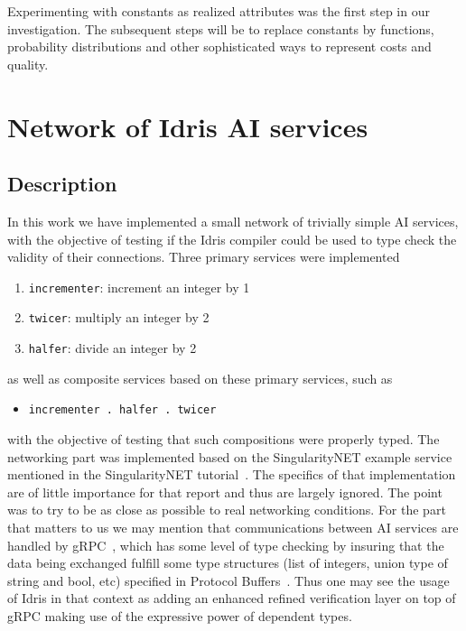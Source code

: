 \documentclass[]{report}
\begin{document}
Experimenting with constants as realized attributes was the first step
in our investigation.  The subsequent steps will be to replace
constants by functions, probability distributions and other
sophisticated ways to represent costs and quality.

\section{Network of Idris AI services}
\label{sec:network_idris_ai_services}

\subsection{Description}

In this work we have implemented a small network of trivially simple
AI services, with the objective of testing if the Idris compiler could
be used to type check the validity of their connections. Three primary
services were implemented
\begin{enumerate}
\item \texttt{incrementer}: increment an integer by 1
\item \texttt{twicer}: multiply an integer by 2
\item \texttt{halfer}: divide an integer by 2
\end{enumerate}
as well as composite services based on these primary services, such as
\begin{itemize}
\item \texttt{incrementer . halfer . twicer}
\end{itemize}
with the objective of testing that such compositions were properly
typed.  The networking part was implemented based on the
SingularityNET example service~\cite{SNETExampleService} mentioned in
the SingularityNET tutorial~\cite{SNETTutorial}.  The specifics of
that implementation are of little importance for that report and thus
are largely ignored.  The point was to try to be as close as possible
to real networking conditions.  For the part that matters to us we may
mention that communications between AI services are handled by
gRPC~\cite{gRPC}, which has some level of type checking by insuring
that the data being exchanged fulfill some type structures (list of
integers, union type of string and bool, etc) specified in Protocol
Buffers~\cite{Protobuf}.  Thus one may see the usage of Idris in that
context as adding an enhanced refined verification layer on top of
gRPC making use of the expressive power of dependent types.
\end{document}
